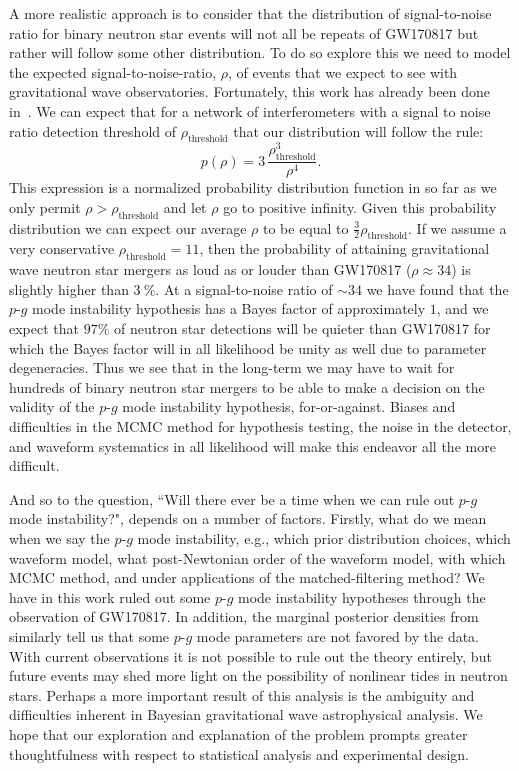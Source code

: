 A more realistic approach is to consider that the distribution of signal-to-noise ratio for binary neutron star events will not all be repeats of GW170817 but rather will follow some other distribution. To do so explore this we need to model the expected signal-to-noise-ratio, $\rho$, of events that we expect to see with gravitational wave observatories. Fortunately, this work has already been done in~\cite{schutz2011networks, chen2014loudest}. We can expect that for a network of interferometers with a signal to noise ratio detection threshold of $\rho_{\mathrm{threshold}}$ that our distribution will follow the rule:
\begin{equation}\label{eqn:universal_snr}
    p(\rho) = 3 \, \frac{\rho_{\mathrm{threshold}}^3}{\rho^4}.
\end{equation}
This expression is a normalized probability distribution function in so far as we only permit $\rho > \rho_{\mathrm{threshold}}$ and let $\rho$ go to positive infinity. Given this probability distribution we can expect our average $\rho$ to be equal to $\frac{3}{2} \rho_{\mathrm{threshold}}$. If we assume a very conservative $\rho_{\mathrm{threshold}} = 11$, then the probability of attaining gravitational wave neutron star mergers as loud as or louder than GW170817 ($\rho \approx 34$) is slightly higher than $3~\%$. At a signal-to-noise ratio of $\sim 34$ we have found that the $p$-$g$ mode instability hypothesis has a Bayes factor of approximately $1$, and we expect that $97 \%$ of neutron star detections will be quieter than GW170817 for which the Bayes factor will in all likelihood be unity as well due to parameter degeneracies. Thus we see that in the long-term we may have to wait for hundreds of binary neutron star mergers to be able to make a decision on the validity of the $p$-$g$ mode instability hypothesis, for-or-against. Biases and difficulties in the MCMC method for hypothesis testing, the noise in the detector, and waveform systematics in all likelihood will make this endeavor all the more difficult.

And so to the question, ``Will there ever be a time when we can rule out $p$-$g$ mode instability?", depends on a number of factors. Firstly, what do we mean when we say the $p$-$g$ mode instability, e.g., which prior distribution choices, which waveform model, what post-Newtonian order of the waveform model, with which MCMC method, and under applications of the matched-filtering method? We have in this work ruled out some $p$-$g$ mode instability hypotheses through the observation of GW170817. In addition, the marginal posterior densities from~\cite{abbott2019constraining} similarly tell us that some $p$-$g$ mode parameters are not favored by the data. With current observations it is not possible to rule out the theory entirely, but future events may shed more light on the possibility of nonlinear tides in neutron stars. Perhaps a more important result of this analysis is the ambiguity and difficulties inherent in Bayesian gravitational wave astrophysical analysis. We hope that our exploration and explanation of the problem prompts greater thoughtfulness with respect to statistical analysis and experimental design.

